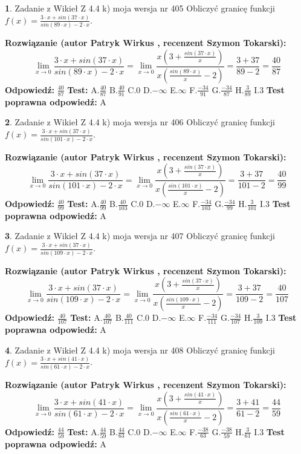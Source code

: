 \documentclass[12pt, a4paper]{article}
\theoremstyle{definition} %
\newtheorem{zad}{}
\newcommand{\zadStart}[1]{\begin{zad}#1\newline}
\newcommand{\zadStop}{\end{zad}}
\newcommand{\rozwStart}[2]{\noindent \textbf{Rozwiązanie (autor #1 , recenzent #2): }\newline}
\newcommand{\rozwStop}{\newline}
\newcommand{\odpStart}{\noindent \textbf{Odpowiedź:}\newline}
\newcommand{\odpStop}{\newline}
\newcommand{\testStart}{\noindent \textbf{Test:}\newline}
\newcommand{\testStop}{\newline}
\newcommand{\kluczStart}{\noindent \textbf{Test poprawna odpowiedź:}\newline}
\newcommand{\kluczStop}{\newline}
\begin{document}
\zadStart{Zadanie z Wikieł Z 4.4 k) moja wersja nr 405}
Obliczyć granicę funkcji $f(x)=\frac{3\cdot x +sin(37\cdot x)}{sin(89\cdot x) -2\cdot x}$.
\zadStop
\rozwStart{Patryk Wirkus}{Szymon Tokarski}
$$\lim\limits_{x\to 0}\frac{3\cdot x +sin(37\cdot x)}{sin(89\cdot x) -2\cdot x}
=\lim\limits_{x\to 0}\frac{x(3+\frac{sin(37\cdot x)}{x})}{x(\frac{sin(89\cdot x)}{x}-2)}
=\frac{3+37}{89-2} = \frac{40}{87}$$
\rozwStop
\odpStart
$\frac{40}{87}$
\odpStop
\testStart
A.$\frac{40}{87}$
B.$\frac{40}{91}$
C.$0$
D.$-\infty$
E.$\infty$
F.$\frac{-34}{91}$
G.$\frac{-34}{87}$
H.$\frac{3}{89}$
I.$3$
\testStop
\kluczStart
A
\kluczStop



\zadStart{Zadanie z Wikieł Z 4.4 k) moja wersja nr 406}
Obliczyć granicę funkcji $f(x)=\frac{3\cdot x +sin(37\cdot x)}{sin(101\cdot x) -2\cdot x}$.
\zadStop
\rozwStart{Patryk Wirkus}{Szymon Tokarski}
$$\lim\limits_{x\to 0}\frac{3\cdot x +sin(37\cdot x)}{sin(101\cdot x) -2\cdot x}
=\lim\limits_{x\to 0}\frac{x(3+\frac{sin(37\cdot x)}{x})}{x(\frac{sin(101\cdot x)}{x}-2)}
=\frac{3+37}{101-2} = \frac{40}{99}$$
\rozwStop
\odpStart
$\frac{40}{99}$
\odpStop
\testStart
A.$\frac{40}{99}$
B.$\frac{40}{103}$
C.$0$
D.$-\infty$
E.$\infty$
F.$\frac{-34}{103}$
G.$\frac{-34}{99}$
H.$\frac{3}{101}$
I.$3$
\testStop
\kluczStart
A
\kluczStop



\zadStart{Zadanie z Wikieł Z 4.4 k) moja wersja nr 407}
Obliczyć granicę funkcji $f(x)=\frac{3\cdot x +sin(37\cdot x)}{sin(109\cdot x) -2\cdot x}$.
\zadStop
\rozwStart{Patryk Wirkus}{Szymon Tokarski}
$$\lim\limits_{x\to 0}\frac{3\cdot x +sin(37\cdot x)}{sin(109\cdot x) -2\cdot x}
=\lim\limits_{x\to 0}\frac{x(3+\frac{sin(37\cdot x)}{x})}{x(\frac{sin(109\cdot x)}{x}-2)}
=\frac{3+37}{109-2} = \frac{40}{107}$$
\rozwStop
\odpStart
$\frac{40}{107}$
\odpStop
\testStart
A.$\frac{40}{107}$
B.$\frac{40}{111}$
C.$0$
D.$-\infty$
E.$\infty$
F.$\frac{-34}{111}$
G.$\frac{-34}{107}$
H.$\frac{3}{109}$
I.$3$
\testStop
\kluczStart
A
\kluczStop



\zadStart{Zadanie z Wikieł Z 4.4 k) moja wersja nr 408}
Obliczyć granicę funkcji $f(x)=\frac{3\cdot x +sin(41\cdot x)}{sin(61\cdot x) -2\cdot x}$.
\zadStop
\rozwStart{Patryk Wirkus}{Szymon Tokarski}
$$\lim\limits_{x\to 0}\frac{3\cdot x +sin(41\cdot x)}{sin(61\cdot x) -2\cdot x}
=\lim\limits_{x\to 0}\frac{x(3+\frac{sin(41\cdot x)}{x})}{x(\frac{sin(61\cdot x)}{x}-2)}
=\frac{3+41}{61-2} = \frac{44}{59}$$
\rozwStop
\odpStart
$\frac{44}{59}$
\odpStop
\testStart
A.$\frac{44}{59}$
B.$\frac{44}{63}$
C.$0$
D.$-\infty$
E.$\infty$
F.$\frac{-38}{63}$
G.$\frac{-38}{59}$
H.$\frac{3}{61}$
I.$3$
\testStop
\kluczStart
A
\kluczStop
\end{document}
